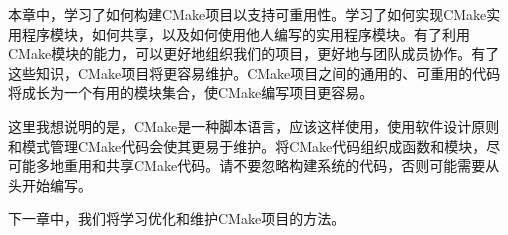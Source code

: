 本章中，学习了如何构建CMake项目以支持可重用性。学习了如何实现CMake实用程序模块，如何共享，以及如何使用他人编写的实用程序模块。有了利用CMake模块的能力，可以更好地组织我们的项目，更好地与团队成员协作。有了这些知识，CMake项目将更容易维护。CMake项目之间的通用的、可重用的代码将成长为一个有用的模块集合，使CMake编写项目更容易。

这里我想说明的是，CMake是一种脚本语言，应该这样使用，使用软件设计原则和模式管理CMake代码会使其更易于维护。将CMake代码组织成函数和模块，尽可能多地重用和共享CMake代码。请不要忽略构建系统的代码，否则可能需要从头开始编写。

下一章中，我们将学习优化和维护CMake项目的方法。

